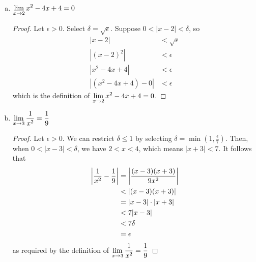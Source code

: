 \begin{enumerate}[(a)]
\begin{proof}
        \end{proof}
  \item $\displaystyle\lim_{x\to2} x^2-4x+4 = 0$
        \begin{proof}
          Let $\epsilon > 0$.
          Select $\delta = \sqrt{\epsilon}$.
          Suppose $0 < |x-2| < \delta$, so
          \begin{align*}
            |x-2|            & < \sqrt{\epsilon} \\
            |(x-2)^2|        & < \epsilon        \\
            |x^2-4x+4|       & < \epsilon        \\
            |(x^2-4x+4) - 0| & < \epsilon
          \end{align*}
          which is the \epsdel{} definition of $\displaystyle\lim_{x\to2} x^2-4x+4 = 0$.
        \end{proof}
  \item $\displaystyle\lim_{x\to3} \frac{1}{x^2} = \frac{1}{9}$
        \begin{proof}
          Let $\epsilon > 0$.
          We can restrict $\delta \leq 1$ by selecting $\delta = \min(1,\frac{\epsilon}{7})$.
          Then, when $0 < |x-3| < \delta$, we have $2 < x < 4$, which means $|x+3| < 7$.
          It follows that
          \begin{align*}
            \abs{\frac{1}{x^2}-\frac{1}{9}} & = \abs{\frac{(x-3)(x+3)}{9x^2}} \\
                                            & < \abs{(x-3)(x+3)}              \\
                                            & = \abs{x-3}\cdot\abs{x+3}       \\
                                            & < 7\abs{x-3}                    \\
                                            & < 7\delta                       \\
                                            & = \epsilon
          \end{align*}
          as required by the \epsdel{} definition of $\displaystyle\lim_{x\to3} \frac{1}{x^2} = \frac{1}{9}$
        \end{proof}
\end{enumerate}


